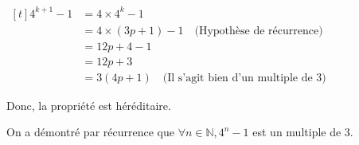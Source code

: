 \documentclass[12pt, a4paper]{book}
\begin{document}
    {\begin{center}
    $\begin{aligned}[t]
        4^{k+1}-1&=4\times 4^k-1 &\\
        &= 4\times\left(3p+1\right)-1 \quad \text{(Hypothèse de récurrence)} &\\
        &=12p+4-1 &\\
        &=12p+3 &\\
        &=3\left(4p+1\right) \quad \text{(Il s'agit bien d'un multiple de 3)}
    \end{aligned}$
    \end{center}} \vspace{\baselineskip}
    {\indent\parbox[t]{\dimexpr\linewidth-\parindent}{
    Donc, la propriété est héréditaire.

    On a démontré par récurrence que $\forall n\in\mathbb{N},4^n-1$ est un multiple de 3.
    }} 
\end{document}
